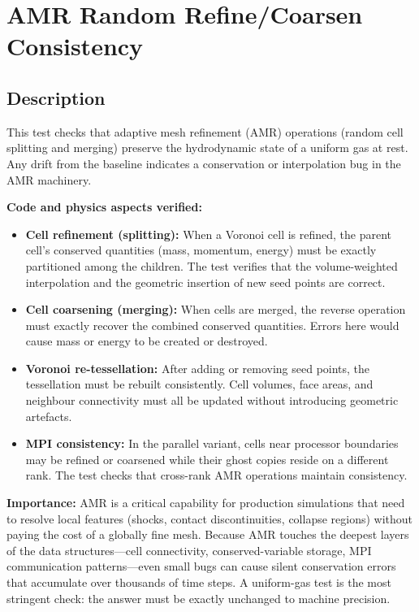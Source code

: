 \documentclass[11pt,a4paper]{article}
\begin{document}
\section{AMR Random Refine/Coarsen Consistency}
\label{sec:amr_random}

\subsection*{Description}
This test checks that adaptive mesh refinement (AMR) operations (random cell splitting and merging) preserve the hydrodynamic state of a uniform gas at rest. Any drift from the baseline indicates a conservation or interpolation bug in the AMR machinery.

\textbf{Code and physics aspects verified:}
\begin{itemize}
  \item \textbf{Cell refinement (splitting):} When a Voronoi cell is refined, the parent cell's conserved quantities (mass, momentum, energy) must be exactly partitioned among the children. The test verifies that the volume-weighted interpolation and the geometric insertion of new seed points are correct.
  \item \textbf{Cell coarsening (merging):} When cells are merged, the reverse operation must exactly recover the combined conserved quantities. Errors here would cause mass or energy to be created or destroyed.
  \item \textbf{Voronoi re-tessellation:} After adding or removing seed points, the tessellation must be rebuilt consistently. Cell volumes, face areas, and neighbour connectivity must all be updated without introducing geometric artefacts.
  \item \textbf{MPI consistency:} In the parallel variant, cells near processor boundaries may be refined or coarsened while their ghost copies reside on a different rank. The test checks that cross-rank AMR operations maintain consistency.
\end{itemize}

\textbf{Importance:} AMR is a critical capability for production simulations that need to resolve local features (shocks, contact discontinuities, collapse regions) without paying the cost of a globally fine mesh. Because AMR touches the deepest layers of the data structures---cell connectivity, conserved-variable storage, MPI communication patterns---even small bugs can cause silent conservation errors that accumulate over thousands of time steps. A uniform-gas test is the most stringent check: the answer must be exactly unchanged to machine precision.
\end{document}
